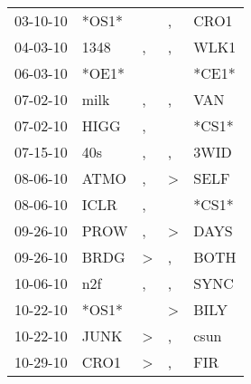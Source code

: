 \begin{supertabular}{p{0.07\textwidth}p{0.06\textwidth}p{0.02\textwidth}p{0.02\textwidth}p{0.06\textwidth}}
          03-10-10\textsuperscript{} &                            *OS1* &                  &                , &           CRO1\textsuperscript{} \\
          04-03-10\textsuperscript{} &           1348\textsuperscript{} &                , &                , &           WLK1\textsuperscript{} \\
          06-03-10\textsuperscript{} &                            *OE1* &                  &                  &                            *CE1* \\
          07-02-10\textsuperscript{} &           milk\textsuperscript{} &                , &                , &            VAN\textsuperscript{} \\
          07-02-10\textsuperscript{} &           HIGG\textsuperscript{} &                , &                  &                            *CS1* \\
          07-15-10\textsuperscript{} &            40s\textsuperscript{} &                , &                , &           3WID\textsuperscript{} \\
          08-06-10\textsuperscript{} &           ATMO\textsuperscript{} &                , &     \textgreater &           SELF\textsuperscript{} \\
          08-06-10\textsuperscript{} &           ICLR\textsuperscript{} &                , &                  &                            *CS1* \\
          09-26-10\textsuperscript{} &           PROW\textsuperscript{} &                , &     \textgreater &           DAYS\textsuperscript{} \\
          09-26-10\textsuperscript{} &           BRDG\textsuperscript{} &     \textgreater &                , &           BOTH\textsuperscript{} \\
          10-06-10\textsuperscript{} &            n2f\textsuperscript{} &                , &                , &           SYNC\textsuperscript{} \\
          10-22-10\textsuperscript{} &                            *OS1* &                  &     \textgreater &           BILY\textsuperscript{} \\
          10-22-10\textsuperscript{} &           JUNK\textsuperscript{} &     \textgreater &                , &           csun\textsuperscript{} \\
          10-29-10\textsuperscript{} &           CRO1\textsuperscript{} &     \textgreater &                , &            FIR\textsuperscript{} \\

\end{supertabular}
